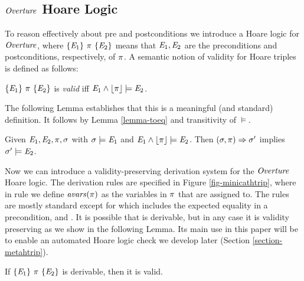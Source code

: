 \subsection{$\mathit{Overture}$ Hoare Logic}

To reason effectively about pre and postconditions we introduce
a Hoare logic for $\mathit{Overture}$,
where $\{ \mathit{E}_1 \}\ \pi\ \{ \mathit{E}_2 \}$ means that $\mathit{E}_1,\mathit{E}_2$ are
the preconditions and postconditions, respectively, of $\pi$.
A semantic notion of validity for Hoare triples is defined as
follows:

\minicathtripfig

\begin{definition}
$\{ \mathit{E}_1 \}\ \pi\ \{ \mathit{E}_2 \}$ is \emph{valid} iff $\mathit{E}_1 \wedge \lfloor \pi \rfloor \models \mathit{E}_2$.
\end{definition}

The following Lemma establishes that this is a meaningful (and
standard) definition. It follows by Lemma \ref{lemma-toeq}
and transitivity of $\models$.
\begin{lemma}
  \label{lemma-hoare}
  Given $\mathit{E}_1, \mathit{E}_2, \pi, \sigma$ with $\sigma \models \mathit{E}_1$
  and $\mathit{E}_1 \wedge \lfloor \pi \rfloor \models \mathit{E}_2$. Then
  $(\sigma,\pi) \Rightarrow \sigma'$ implies $\sigma' \models
  \mathit{E}_2$.
\end{lemma}

Now we can introduce a validity-preserving derivation system for the
$\mathit{Overture}$ Hoare logic.  The derivation rules are specified in Figure
\ref{fig-minicathtrip}, where in rule  we define
$\mathit{avars}(\pi)$ as the variables in $\pi$ that are assigned to.  The
rules are mostly standard except for  which includes
the expected equality in a precondition, and .  It is
possible that  is derivable, but in any case it is
validity preserving as we show in the following Lemma. Its main use in
this paper will be to enable an automated Hoare logic check we develop
later (Section \ref{section-metahtrip}).
\begin{lemma}
  \label{lemma-hoare-sound}
  If $\{ \mathit{E}_1 \}\ \pi\ \{ \mathit{E}_2 \}$ is derivable, then it is valid.
\end{lemma}


